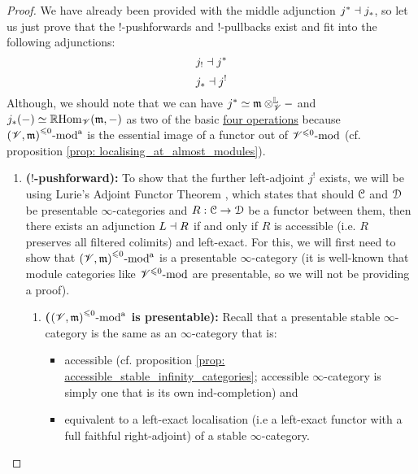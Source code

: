                     \begin{proof}
                        We have already been provided with the middle adjunction $j^* \dashv j_*$, so let us just prove that the $!$-pushforwards and $!$-pullbacks exist and fit into the following adjunctions:
                            $$j_! \dashv j^*$$
                            $$j_* \dashv j^!$$
                        Although, we should note that we can have $j^* \cong \m \tensor_{\scrV}^{\L} -$ and $j_*(-) \simeq \mathbb{R}\mathrm{Hom}_{\mathscr{V}}(\mathfrak{m}, -)$ as two of the basic \href{https://ncatlab.org/nlab/show/six+operations}{\underline{four operations}} because ${(\mathscr{V}, \mathfrak{m})}^{\leqslant 0}\text{-}\mathrm{mod}^{\mathrm{a}}$ is the essential image of a functor out of ${\mathscr{V}}^{\leqslant 0}\text{-}\mathrm{mod}$ (cf. proposition \ref{prop: localising_at_almost_modules}). 
                            \begin{enumerate}
                                \item \textbf{($!$-pushforward):} To show that the further left-adjoint $j^!$ exists, we will be using Lurie's Adjoint Functor Theorem \cite[Corollary 5.5.2.9]{HTT}, which states that should $\mathcal{C}$ and $\mathcal{D}$ be presentable $\infty$-categories and $R: \mathcal{C} \to \mathcal{D}$ be a functor between them, then there exists an adjunction $L \dashv R$ if and only if $R$ is accessible (i.e. $R$ preserves all filtered colimits) and left-exact. For this, we will first need to show that ${(\mathscr{V}, \mathfrak{m})}^{\leqslant 0}\text{-}\mathrm{mod}^{\mathrm{a}}$ is a presentable $\infty$-category (it is well-known that module categories like ${\mathscr{V}}^{\leqslant 0}\text{-}\mathrm{mod}$ are presentable, so we will not be providing a proof).
                                    \begin{enumerate}
                                        \item \textbf{(${(\mathscr{V}, \mathfrak{m})}^{\leqslant 0}\text{-}\mathrm{mod}^{\mathrm{a}}$ is presentable):} Recall that a presentable stable $\infty$-category is the same as an $\infty$-category that is:
                                            \begin{itemize}
                                                \item accessible (cf. proposition \ref{prop: accessible_stable_infinity_categories}; accessible $\infty$-category is simply one that is its own ind-completion) and
                                                \item equivalent to a left-exact localisation (i.e a left-exact functor with a full faithful right-adjoint) of a stable $\infty$-category.
                                            \end{itemize}  
                                            

\end{enumerate}
\end{enumerate}
\end{proof}
